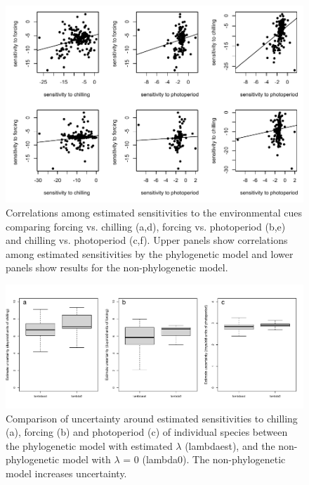 \documentclass[11pt]{article}
\begin{document}
\clearpage
\begin{figure}
  \begin{center}
  \includegraphics[width=16cm]{../../analyses/phylogeny/figures/FigSX_Sindromes_lamb_lamb0.pdf}
  \caption{Correlations among estimated sensitivities to the environmental cues comparing forcing vs. chilling (a,d), forcing vs. photoperiod (b,e) and chilling vs. photoperiod (c,f). Upper panels show correlations among estimated sensitivities by the phylogenetic model and lower panels show results for the non-phylogenetic model.}
  \label{fig:suppcorrelsens}
  \end{center}
\end{figure}

\clearpage
\begin{figure}
  \begin{center}
  \includegraphics[width=16cm]{../../analyses/phylogeny/figures/FigSXXX_comparison_eachsps_uncertainty.pdf}
  \caption{Comparison of uncertainty around estimated sensitivities to chilling (a), forcing (b) and photoperiod (c) of individual species between the phylogenetic model with estimated $\lambda$ (lambdaest), and the non-phylogenetic model with $\lambda$ = 0 (lambda0). The non-phylogenetic model increases uncertainty.}
  \label{fig:suppuncertainties}
  \end{center}
\end{figure}
\end{document}
